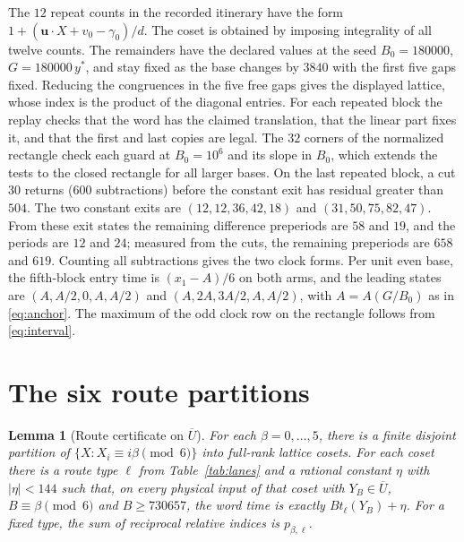 \documentclass[11pt,reqno]{amsart}
\newtheorem{lemma}[theorem]{Lemma}
\theoremstyle{remark}
\begin{document}
The \(12\) repeat counts in the recorded itinerary have the form \(1+(\mathbf u\cdot X+v_0-\gamma_0)/d\). The coset is obtained by imposing integrality of all twelve counts. The remainders have the declared values at the seed \(B_0=180000\), \(G=180000\,y^*\), and stay fixed as the base changes by \(3840\) with the first five gaps fixed. Reducing the congruences in the five free gaps gives the displayed lattice, whose index is the product of the diagonal entries. For each repeated block the replay checks that the word has the claimed translation, that the linear part fixes it, and that the first and last copies are legal. The \(32\) corners of the normalized rectangle check each guard at \(B_0=10^6\) and its slope in \(B_0\), which extends the tests to the closed rectangle for all larger bases. On the last repeated block, a cut \(30\) returns (\(600\) subtractions) before the constant exit has residual greater than \(504\). The two constant exits are \((12,12,36,42,18)\) and \((31,50,75,82,47)\). From these exit states the remaining difference preperiods are \(58\) and \(19\), and the periods are \(12\) and \(24\); measured from the cuts, the remaining preperiods are \(658\) and \(619\). Counting all subtractions gives the two clock forms. Per unit even base, the fifth-block entry time is \((x_1-A)/6\) on both arms, and the leading states are \((A,A/2,0,A,A/2)\) and \((A,2A,3A/2,A,A/2)\), with \(A=A(G/B_0)\) as in \eqref{eq:anchor}. The maximum of the odd clock row on the rectangle follows from \eqref{eq:interval}.

\section{The six route partitions}

\begin{lemma}[Route certificate on \(\overline U\)]\label{lem:mixture-certificate}
For each \(\beta=0,\ldots,5\), there is a finite disjoint partition of \(\{X:X_i\equiv i\beta\pmod6\}\) into full-rank lattice cosets. For each coset there is a route type \(\ell\) from Table~\ref{tab:lanes} and a rational constant \(\eta\) with \(|\eta|<144\) such that, on every physical input of that coset with \(Y_B\in\overline U\), \(B\equiv\beta\pmod6\) and \(B\ge730657\), the word time is exactly \(Bt_\ell(Y_B)+\eta\). For a fixed type, the sum of reciprocal relative indices is \(p_{\beta,\ell}\).
\end{lemma}
\end{document}
